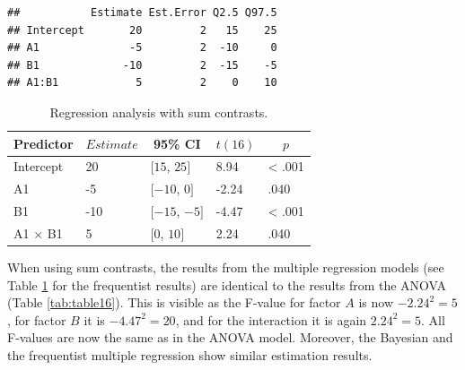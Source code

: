 \documentclass[12pt,]{krantz}
\newenvironment{Shaded}{\begin{snugshade}}{\end{snugshade}}
\newcommand{\DataTypeTok}[1]{\textcolor[rgb]{0.13,0.29,0.53}{#1}}
\newcommand{\DecValTok}[1]{\textcolor[rgb]{0.00,0.00,0.81}{#1}}
\newcommand{\KeywordTok}[1]{\textcolor[rgb]{0.13,0.29,0.53}{\textbf{#1}}}
\newcommand{\NormalTok}[1]{#1}
\newcommand{\OperatorTok}[1]{\textcolor[rgb]{0.81,0.36,0.00}{\textbf{#1}}}
\newcommand{\StringTok}[1]{\textcolor[rgb]{0.31,0.60,0.02}{#1}}
\theoremstyle{definition}
\theoremstyle{definition}
\theoremstyle{definition}
\theoremstyle{remark}
\begin{document}
\begin{verbatim}
##           Estimate Est.Error Q2.5 Q97.5
## Intercept       20         2   15    25
## A1              -5         2  -10     0
## B1             -10         2  -15    -5
## A1:B1            5         2    0    10
\end{verbatim}

\begin{Shaded}
\end{Shaded}

\begin{table}[h]

\begin{center}
\begin{threeparttable}

\caption{\label{tab:table18}Regression analysis with sum contrasts.}

\begin{tabular}{lllll}
\toprule
Predictor & \multicolumn{1}{c}{$Estimate$} & \multicolumn{1}{c}{95\% CI} & \multicolumn{1}{c}{$t(16)$} & \multicolumn{1}{c}{$p$}\\
\midrule
Intercept & 20 & $[15$, $25]$ & 8.94 & < .001\\
A1 & -5 & $[-10$, $0]$ & -2.24 & .040\\
B1 & -10 & $[-15$, $-5]$ & -4.47 & < .001\\
A1 $\times$ B1 & 5 & $[0$, $10]$ & 2.24 & .040\\
\bottomrule
\end{tabular}

\end{threeparttable}
\end{center}

\end{table}

When using sum contrasts, the results from the multiple regression models (see Table \ref{tab:table18} for the frequentist results) are identical to the results from the ANOVA (Table \ref{tab:table16}). This is visible as the F-value for factor \(A\) is now \(-2.24^2 = 5\), for factor \(B\) it is \(-4.47^2 = 20\), and for the interaction it is again \(2.24^2 = 5\). All F-values are now the same as in the ANOVA model. Moreover, the Bayesian and the frequentist multiple regression show similar estimation results.
\end{document}
